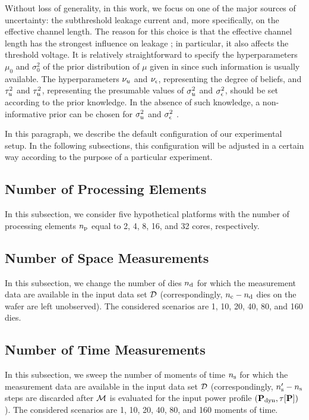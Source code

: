 Without loss of generality, in this work, we focus on one of the major sources of uncertainty: the subthreshold leakage current and, more specifically, on the effective channel length. The reason for this choice is that the effective channel length has the strongest influence on leakage \cite{juan2011, juan2012}; in particular, it also affects the threshold voltage. It is relatively straightforward to specify the hyperparameters $\mu_0$ and $\sigma^2_0$ of the prior distribution of $\mu$ given in  since such information is usually available. The hyperparameters $\nu_u$ and $\nu_\epsilon$, representing the degree of beliefs, and $\tau^2_u$ and $\tau^2_u$, representing the presumable values of $\sigma^2_u$ and $\sigma^2_\epsilon$, should be set according to the prior knowledge. In the absence of such knowledge, a non-informative prior can be chosen for $\sigma^2_u$ and $\sigma^2_\epsilon$ \cite{gelman2004}.

In this paragraph, we describe the default configuration of our experimental setup. In the following subsections, this configuration will be adjusted in a certain way according to the purpose of a particular experiment.

\subsection{Number of Processing Elements}
In this subsection, we consider five hypothetical platforms with the number of processing elements ${n_\text{p}}$ equal to 2, 4, 8, 16, and 32 cores, respectively.

\subsection{Number of Space Measurements}
In this subsection, we change the number of dies ${n_{\text{d}}}$ for which the measurement data are available in the input data set $\mathcal{D}$ (correspondingly, ${n_{\text{c}}} - {n_{\text{d}}}$ dies on the wafer are left unobserved). The considered scenarios are 1, 10, 20, 40, 80, and 160 dies.

\subsection{Number of Time Measurements}
In this subsection, we sweep the number of moments of time ${n_\text{s}}$ for which the measurement data are available in the input data set $\mathcal{D}$ (correspondingly, ${n_\text{s}'} - {n_\text{s}}$ steps are discarded after $\model$ is evaluated for the input power profile $(\mathbf{P}_{\text{dyn}}, \tau[\mathbf{P}])$). The considered scenarios are 1, 10, 20, 40, 80, and 160 moments of time.

